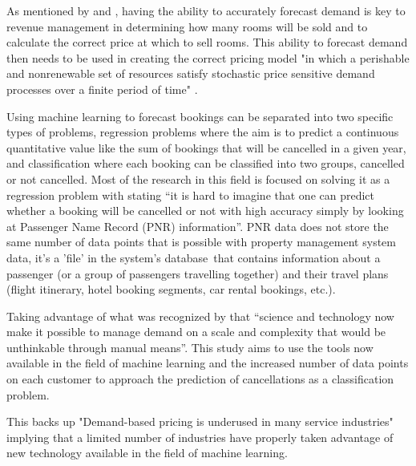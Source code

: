 \vspace{5mm}

As mentioned by \cite{RevenueWorldCat.org} and \cite{Weatherford2003AManagement}, having the ability to accurately forecast demand is key to revenue management in determining how many rooms will be sold and to calculate the correct price at which to sell rooms. This ability to forecast demand then needs to be used in creating the correct pricing model "in which a perishable and nonrenewable set of resources satisfy stochastic price sensitive demand processes over a finite period of time" \cite{Bitran2003AnManagement}.

\vspace{5mm}

Using machine learning to forecast bookings can be separated into two specific types of problems, regression problems where the aim is to predict a continuous quantitative value like the sum of bookings that will be cancelled in a given year, and classification where each booking can be classified into two groups, cancelled or not cancelled. Most of the research in this field is focused on solving it as a regression problem with  \cite{RomeroMorales2010ForecastingMining} stating “it is hard to imagine that one can predict whether a booking will be cancelled or not with high accuracy simply by looking at Passenger Name Record (PNR) information”. PNR data does not store the same number of data points that is possible with property management system data, it's a 'file' in the system's database that contains information about a passenger (or a group of passengers travelling together) and their travel plans (flight itinerary, hotel booking segments, car rental bookings, etc.).

\vspace{5mm}

Taking advantage of what was recognized by \cite{Talluri2004TheManagement} that “science and technology now make it possible to manage demand on a scale and complexity that would be unthinkable through manual means”.  This study aims to use the tools now available in the field of machine learning and the increased number of data points on each customer to approach the prediction of cancellations as a classification problem.   

This backs up "Demand-based pricing is underused in many service industries" \cite{Kimes2003HasAcceptable} implying that a limited number of industries have properly taken advantage of new technology available in the field of machine learning.

